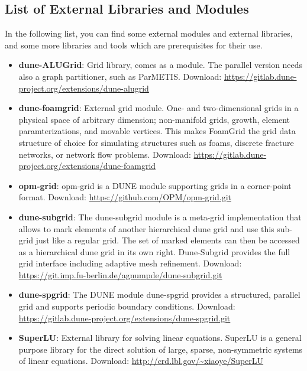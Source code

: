 \subsection{List of External Libraries and Modules}
\label{sec:listofexternallibs}

In the following list, you can find some external modules and external libraries,
and some more libraries and tools which are prerequisites for their use.

\begin{itemize}
\item \textbf{dune-ALUGrid}: Grid library, comes as a \Dune module.
  The parallel version needs also a graph partitioner, such as {ParMETIS}.
  Download: \url{https://gitlab.dune-project.org/extensions/dune-alugrid}

\item \textbf{dune-foamgrid}: External grid module. One- and two-dimensional grids
  in a physical space of arbitrary dimension; non-manifold grids, growth, element
  paramterizations, and movable vertices. This makes FoamGrid the grid data structure
  of choice for simulating structures such as foams, discrete fracture networks,
  or network flow problems.
  Download: \url{https://gitlab.dune-project.org/extensions/dune-foamgrid}

\item \textbf{opm-grid}: opm-grid is a DUNE module supporting grids in a corner-point format.
  Download: \url{https://github.com/OPM/opm-grid.git}

\item \textbf{dune-subgrid}: The dune-subgrid module is a meta-grid implementation that allows
to mark elements of another hierarchical dune grid and use this sub-grid just like a regular grid.
The set of marked elements can then be accessed as a hierarchical dune grid in its own right.
Dune-Subgrid provides the full grid interface including adaptive mesh refinement.
  Download: \url{https://git.imp.fu-berlin.de/agnumpde/dune-subgrid.git}

\item \textbf{dune-spgrid}: The DUNE module dune-spgrid provides a structured, parallel grid
and supports periodic boundary conditions.
  Download: \url{https://gitlab.dune-project.org/extensions/dune-spgrid.git}

\item \textbf{SuperLU}: External library for solving linear equations. SuperLU is a general purpose
  library for the direct solution of large, sparse, non-symmetric systems of linear equations.
  Download: \url{http://crd.lbl.gov/~xiaoye/SuperLU}


\end{itemize}

